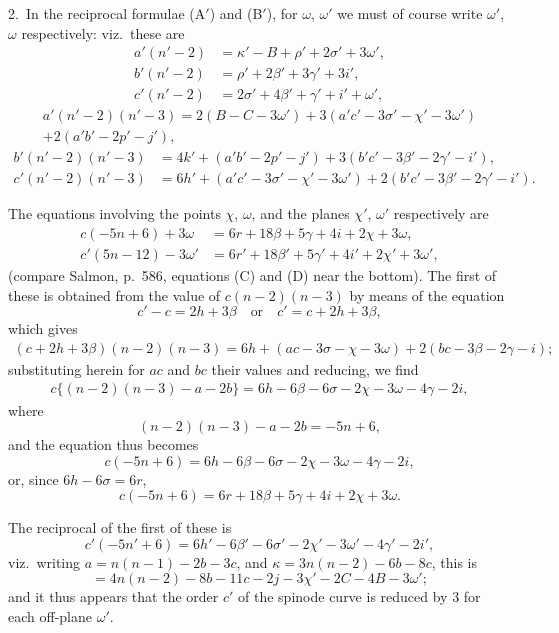 \documentclass[11pt,a4paper]{article}
\theoremstyle{plain}
\theoremstyle{definition}
\theoremstyle{remark}
\begin{document}
\newpage
\setcounter{page}{606}

2.\ In the reciprocal formulae (A$'$) and (B$'$), for $\omega$, $\omega'$ we must of course write $\omega'$, $\omega$ respectively: viz.\ these are
\begin{align}
a'(n'-2) &= \kappa'-B+\rho'+2\sigma'+3\omega',\\
b'(n'-2) &= \rho'+2\beta'+3\gamma'+3i',\\
c'(n'-2) &= 2\sigma'+4\beta'+\gamma'+i'+\omega',
\end{align}
\begin{multline}
a'(n'-2)(n'-3)=2(B-C-3\omega')+3(a'c'-3\sigma'-\chi'-3\omega')\\
+2(a'b'-2p'-j'),
\end{multline}
\begin{align}
b'(n'-2)(n'-3) &= 4k'+(a'b'-2p'-j')+3(b'c'-3\beta'-2\gamma'-i'),\\
c'(n'-2)(n'-3) &= 6h'+(a'c'-3\sigma'-\chi'-3\omega')+2(b'c'-3\beta'-2\gamma'-i').
\end{align}

The equations involving the points $\chi$, $\omega$, and the planes $\chi'$, $\omega'$ respectively are
\begin{align}
c(-5n+6)+3\omega &= 6r+18\beta+5\gamma+4i+2\chi+3\omega,\\
c'(5n-12)-3\omega' &= 6r'+18\beta'+5\gamma'+4i'+2\chi'+3\omega',
\end{align}
(compare Salmon, p.~586, equations (C) and (D) near the bottom). The first of these is obtained from the value of $c(n-2)(n-3)$ by means of the equation
\[
c'-c=2h+3\beta\quad\text{or}\quad c'=c+2h+3\beta,
\]
which gives
\begin{multline*}
(c+2h+3\beta)(n-2)(n-3)=6h+(ac-3\sigma-\chi-3\omega)+2(bc-3\beta-2\gamma-i);
\end{multline*}
substituting herein for $ac$ and $bc$ their values and reducing, we find
\begin{multline*}
c\{(n-2)(n-3)-a-2b\}=6h-6\beta-6\sigma-2\chi-3\omega-4\gamma-2i,
\end{multline*}
where
\[
(n-2)(n-3)-a-2b=-5n+6,
\]
and the equation thus becomes
\[
c(-5n+6)=6h-6\beta-6\sigma-2\chi-3\omega-4\gamma-2i,
\]
or, since $6h-6\sigma=6r$,
\[
c(-5n+6)=6r+18\beta+5\gamma+4i+2\chi+3\omega.
\]

\newpage
\setcounter{page}{607}

The reciprocal of the first of these is
\[
c'(-5n'+6)=6h'-6\beta'-6\sigma'-2\chi'-3\omega'-4\gamma'-2i',
\]
viz.\ writing $a=n(n-1)-2b-3c$, and $\kappa=3n(n-2)-6b-8c$, this is
\[
=4n(n-2)-8b-11c-2j-3\chi'-2C-4B-3\omega';
\]
and it thus appears that the order $c'$ of the spinode curve is reduced by $3$ for each off-plane $\omega'$.
\end{document}
